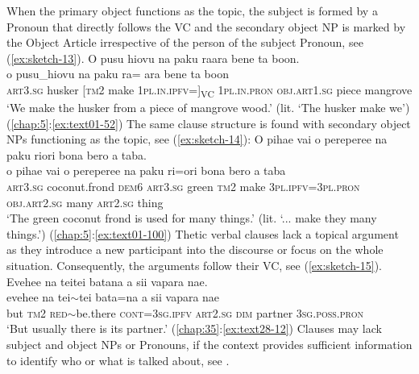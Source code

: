 \documentclass[output=paper]{langscibook}
\begin{document}
When the primary object functions as the topic, the subject is formed by a Pronoun that directly follows the VC and the secondary object NP is marked by the Object Article irrespective of the person of the subject Pronoun, see (\ref{ex:sketch-13}).
\ea\label{ex:sketch-13}
    O pusu hiovu na paku raara bene ta boon.\\
    \gll o	pusu\_hiovu	na	paku	ra=  ara	bene	ta	boon\\
    \textsc{art}3.\textsc{sg}	husker	[\textsc{tm}2	make	1\textsc{pl}.\textsc{in}.\textsc{ipfv}=]\textsubscript{VC} 1\textsc{pl}.\textsc{in}.\textsc{pron}	\textsc{obj}.\textsc{art}1.\textsc{sg}	piece	mangrove\\
    \glt `We make the husker from a piece of mangrove wood.' (lit. `The husker make we') (\ref{chap:5}:\ref{ex:text01-52})
\z
The same clause structure is found with secondary object NPs functioning as the topic, see (\ref{ex:sketch-14}):
\ea\label{ex:sketch-14}
    O pihae vai o pereperee na paku riori bona bero a taba.\\
    \gll o	pihae	vai	o	pereperee	na	paku	ri=ori	bona	bero\footnotemark{}	a	taba\\
    \textsc{art}3.\textsc{sg}	coconut.frond	\textsc{dem}6	\textsc{art}3.\textsc{sg}	green	\textsc{tm}2	make	3\textsc{pl}.\textsc{ipfv}=3\textsc{pl}.\textsc{pron}	\textsc{obj}.\textsc{art}2.\textsc{sg}	many	\textsc{art}2.\textsc{sg}	thing\\
    \glt `The green coconut frond is used for many things.' (lit. `... make they many things.') (\ref{chap:5}:\ref{ex:text01-100})
\z{}
Thetic verbal clauses lack a topical argument as they introduce a new participant into the discourse or focus on the whole situation. Consequently, the arguments follow their VC, see (\ref{ex:sketch-15}).
\ea\label{ex:sketch-15}
    Evehee na teitei batana a sii vapara nae.\\
    \gll evehee	na	tei{$\sim$}tei	bata=na	a	sii	vapara	nae\\
    but	\textsc{tm}2	\textsc{red}{$\sim$}be.there	\textsc{cont}=3\textsc{sg}.\textsc{ipfv}	\textsc{art}2.\textsc{sg}	\textsc{dim}	partner	3\textsc{sg}.\textsc{poss}.\textsc{pron}\\
    \glt `But usually there is its partner.' (\ref{chap:35}:\ref{ex:text28-12})
\z
Clauses may lack subject and object NPs or Pronouns, if the context provides sufficient information to identify who or what is talked about, see .
\end{document}
